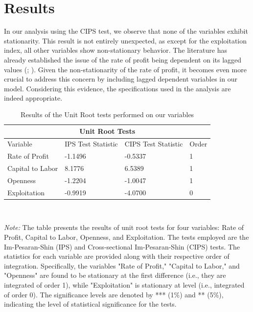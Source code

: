 \documentclass[10pt]{article}
\begin{document}
\section{Results}
In our analysis using the CIPS test, we observe that none of the variables exhibit stationarity. This result is not entirely unexpected, as except for the exploitation index, all other variables show non-stationary behavior. The literature has already established the issue of the rate of profit being dependent on its lagged values (\citet{Alexiou2022}; \citet{BasuManolakos2013}). Given the non-stationarity of the rate of profit, it becomes even more crucial to address this concern by including lagged dependent variables in our model. Considering this evidence, the specifications used in the analysis are indeed appropriate.
\begin{table}[h]
\begin{center}
\begin{tabular}{|p{3cm}||p{3cm}|p{3cm}|p{2cm}|}
 \hline
 \multicolumn{4}{|c|}{Unit Root Tests} \\
 \hline
 Variable & IPS Test Statistic & CIPS Test Statistic & Order \\
 \hline
 Rate of Profit &  -1.1496 & -0.5337 & 1 \\
 Capital to Labor &  8.1776 &  6.5389 & 1 \\
 Openness & -1.2204 & -1.0047 & 1 \\
 Exploitation &  -0.9919 & -4.0700 & 0 \\ 
 \hline
\end{tabular} \\
\begin{minipage}[t]{\textwidth}
\small
\textit{Note:} The table presents the results of unit root tests for four variables: Rate of Profit, Capital to Labor, Openness, and Exploitation. The tests employed are the Im-Pesaran-Shin (IPS) and Cross-sectional Im-Pesaran-Shin (CIPS) tests. The statistics for each variable are provided along with their respective order of integration. Specifically, the variables "Rate of Profit," "Capital to Labor," and "Openness" are found to be stationary at the first difference (i.e., they are integrated of order 1), while "Exploitation" is stationary at level (i.e., integrated of order 0). The significance levels are denoted by *** (1\%) and ** (5\%), indicating the level of statistical significance for the tests.
\end{minipage}

\end{center}
\caption{Results of the Unit Root tests performed on our variables}
\end{table}  
\end{document}
